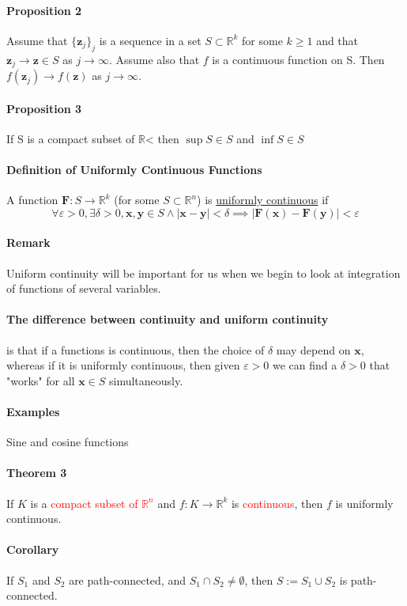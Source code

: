\documentclass[11pt]{article}
\newcommand{\tb}[1]{\textbf{#1}}
\newcommand{\real}[0]{\mathbb{R}}
\newcommand{\under}[1]{\underline{#1}}
\newcommand{\vx}[0]{\tb{x}}
\newcommand{\vy}[0]{\tb{y}}
\newcommand{\vz}[0]{\tb{z}}
\newcommand{\vf}[0]{\tb{F}}
\begin{document}
\paragraph{Proposition 2} Assume that $\{\vz_j\}_j$ is a sequence in a set $S \subset \real^k$ for some $k \geq 1$ and that $\vz_j \rightarrow \vz \in S$ as $ j \rightarrow \infty$. Assume also that $f$ is a continuous function on S. Then $f(\vz_j) \rightarrow f(\vz)$ as $j \rightarrow \infty$.
\paragraph{Proposition 3} If S is a compact subset of $\real$< then $\sup S \in S$ and $\inf S \in S$
\paragraph{Definition of Uniformly Continuous Functions} A function $\vf: S \rightarrow \real^k$ (for some $S \subset \real^n$) is \under{uniformly continuous} if
$$\forall \varepsilon > 0, \exists \delta > 0, \vx, \vy \in S \wedge |\vx - \vy| < \delta \implies |\vf(\vx) - \vf(\vy)| < \varepsilon$$
\paragraph{Remark} Uniform continuity will be important for us when we begin to look at integration of functions of several variables. 
\paragraph{The difference between continuity and uniform continuity} is that if a functions is continuous, then the choice of $\delta$ may depend on $\vx$, whereas if it is uniformly continuous, then given $\varepsilon >0$ we can find a $\delta > 0$ that "works" for all $\vx \in S$ simultaneously.
\paragraph{Examples} Sine and cosine functions
\paragraph{Theorem 3} If $K$ is a \textcolor{red}{compact subset of $\real^n$} and $f: K \rightarrow \real^k$ is \textcolor{red}{continuous}, then $f$ is uniformly continuous.
\paragraph{Corollary}
If $S_1$ and $S_2$ are path-connected, and $S_1 \cap S_2 \neq \emptyset$, then $S := S_1 \cup S_2$ is path-connected.
\end{document}
